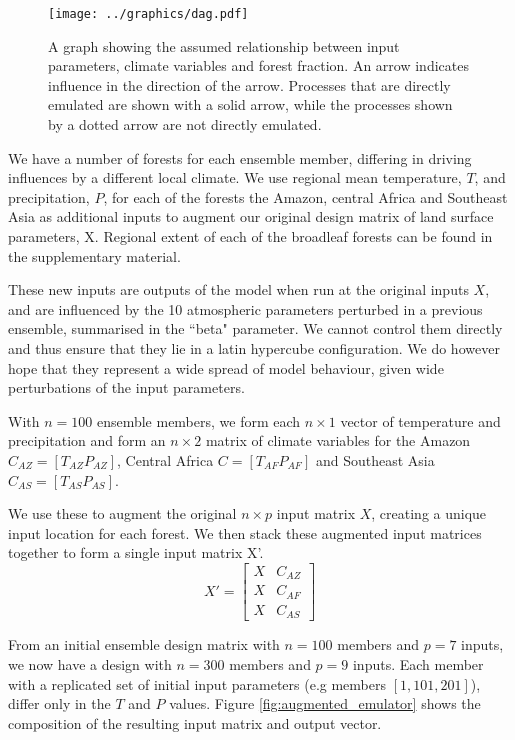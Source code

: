 \documentclass[gmd, manuscript]{copernicus}
\begin{document}
\begin{figure}[t]
\texttt{[image: ../graphics/dag.pdf]}
\caption{A graph showing the assumed relationship between input parameters, climate variables and forest fraction. An arrow indicates influence in the direction of the arrow. Processes that are directly emulated are shown with a solid arrow, while the processes shown by a dotted arrow are not directly emulated. 
}
\label{fig:dag}
\end{figure}

We have a number of forests for each ensemble member, differing in driving influences by a different local climate. We use regional mean temperature, $T$, and precipitation, $P$, for each of the forests the Amazon, central Africa and Southeast Asia as additional inputs to augment our original design matrix of land surface parameters, X. Regional extent of each of the broadleaf forests can be found in the supplementary material.

These new inputs are outputs of the model when run at the original inputs $X$, and are influenced by the 10 atmospheric parameters perturbed in a previous ensemble, summarised in the ``beta" parameter. We cannot control them directly and thus ensure that they lie in a latin hypercube configuration. We do however hope that they represent a wide spread of model behaviour, given wide perturbations of the input parameters.

With $n = 100$ ensemble members, we form each  $n \times 1$ vector of temperature and precipitation and form an $n \times 2$  matrix of climate variables for the Amazon $C_{AZ} = [T_{AZ} P_{AZ}]$, Central Africa $C=[T_{AF} P_{AF}]$ and Southeast Asia $C_{AS} = [T_{AS} P_{AS}]$. 
 
 We use these to augment the original $n \times p$ input matrix $X$, creating a unique input location for each forest. We then stack these augmented input matrices together to form a single input matrix X'.
\begin{equation}
X' = \begin{bmatrix}
X & C_{AZ} \\
X & C_{AF}  \\
X & C_{AS}
\end{bmatrix}
\end{equation}

From an initial ensemble design matrix with $n=100$ members and $p=7$ inputs, we now have a design with $n=300$ members and $p=9$ inputs. Each member with a replicated set of initial input parameters (e.g members $[1, 101, 201]$), differ only in the $T$ and $P$ values. Figure \ref{fig:augmented_emulator} shows the composition of the resulting input matrix and output vector.
\end{document}
